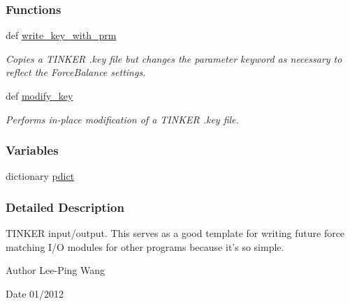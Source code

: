 \subsubsection*{Functions}
\begin{DoxyCompactItemize}
\item 
def \hyperlink{namespaceforcebalance_1_1tinkerio_a9cde7bd64c6f5286c1f33a39211d5a11}{write\-\_\-key\-\_\-with\-\_\-prm}
\begin{DoxyCompactList}\small\item\em Copies a T\-I\-N\-K\-E\-R .key file but changes the parameter keyword as necessary to reflect the Force\-Balance settings. \end{DoxyCompactList}\item 
def \hyperlink{namespaceforcebalance_1_1tinkerio_aa82c424420ad59b6a78b273d6c1fd469}{modify\-\_\-key}
\begin{DoxyCompactList}\small\item\em Performs in-\/place modification of a T\-I\-N\-K\-E\-R .key file. \end{DoxyCompactList}\end{DoxyCompactItemize}
\subsubsection*{Variables}
\begin{DoxyCompactItemize}
\item 
dictionary \hyperlink{namespaceforcebalance_1_1tinkerio_a714d1b926359d7d11559720e422ec34d}{pdict}
\end{DoxyCompactItemize}


\subsubsection{Detailed Description}
T\-I\-N\-K\-E\-R input/output. This serves as a good template for writing future force matching I/\-O modules for other programs because it's so simple.

\begin{DoxyAuthor}{Author}
Lee-\/\-Ping Wang 
\end{DoxyAuthor}
\begin{DoxyDate}{Date}
01/2012 
\end{DoxyDate}


